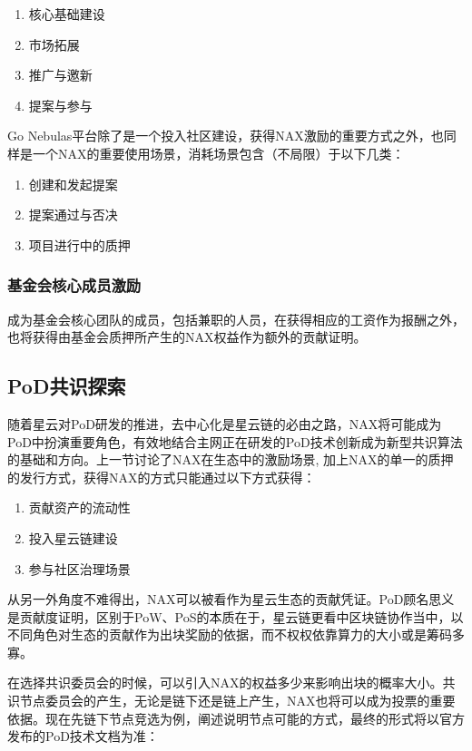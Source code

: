 \begin{enumerate}[\hspace{1cm}(a)]
  \item 核心基础建设
  \item 市场拓展
  \item 推广与邀新
  \item 提案与参与
\end{enumerate}

Go Nebulas平台除了是一个投入社区建设，获得NAX激励的重要方式之外，也同样是一个NAX的重要使用场景，消耗场景包含（不局限）于以下几类：
\begin{enumerate}[\hspace{1cm}(a)]
  \item 创建和发起提案
  \item 提案通过与否决
  \item 项目进行中的质押
\end{enumerate}

\subsubsection{基金会核心成员激励}
成为基金会核心团队的成员，包括兼职的人员，在获得相应的工资作为报酬之外，也将获得由基金会质押所产生的NAX权益作为额外的贡献证明。

\subsection{PoD共识探索}
随着星云对PoD研发的推进，去中心化是星云链的必由之路，NAX将可能成为PoD中扮演重要角色，有效地结合主网正在研发的PoD技术创新成为新型共识算法的基础和方向。上一节讨论了NAX在生态中的激励场景, 加上NAX的单一的质押的发行方式，获得NAX的方式只能通过以下方式获得：
\begin{enumerate}[\hspace{1cm}(i)]
  \item 贡献资产的流动性
  \item 投入星云链建设
  \item 参与社区治理场景
\end{enumerate}

从另一外角度不难得出，NAX可以被看作为星云生态的贡献凭证。PoD顾名思义是贡献度证明，区别于PoW、PoS的本质在于，星云链更看中区块链协作当中，以不同角色对生态的贡献作为出块奖励的依据，而不权权依靠算力的大小或是筹码多寡。

在选择共识委员会的时候，可以引入NAX的权益多少来影响出块的概率大小。共识节点委员会的产生，无论是链下还是链上产生，NAX也将可以成为投票的重要依据。现在先链下节点竞选为例，阐述说明节点可能的方式，最终的形式将以官方发布的PoD技术文档为准：

